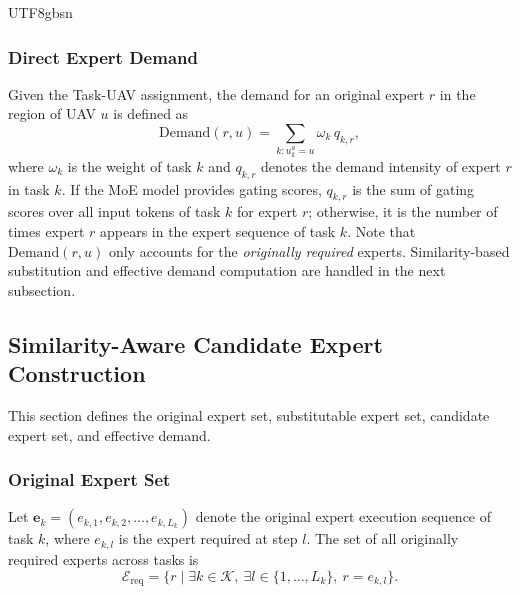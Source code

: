 \documentclass[journal]{IEEEtran}
\begin{document}
\begin{CJK*}{UTF8}{gbsn}
\subsubsection{Direct Expert Demand}
Given the Task-UAV assignment, the demand for an original expert \(r\) in the region of UAV \(u\) is defined as
\begin{equation}
\mathrm{Demand}(r,u) = \sum_{k : u_k^a = u} \omega_k \, q_{k,r},
\label{eq:demand}
\end{equation}
where \(\omega_k\) is the weight of task \(k\) and \(q_{k,r}\) denotes the demand intensity of expert \(r\) in task \(k\). If the MoE model provides gating scores, \(q_{k,r}\) is the sum of gating scores over all input tokens of task \(k\) for expert \(r\); otherwise, it is the number of times expert \(r\) appears in the expert sequence of task \(k\).
Note that \(\mathrm{Demand}(r,u)\) only accounts for the \emph{originally required} experts. Similarity-based substitution and effective demand computation are handled in the next subsection.

\subsection{Similarity-Aware Candidate Expert Construction}
\label{sec:similarity_candidate}
This section defines the original expert set, substitutable expert set, candidate expert set, and effective demand.
\subsubsection{Original Expert Set}
Let \(\mathbf{e}_k = (e_{k,1}, e_{k,2}, \dots, e_{k,L_k})\) denote the original expert execution sequence of task \(k\), where \(e_{k,l}\) is the expert required at step \(l\). The set of all originally required experts across tasks is
\begin{equation}
\mathcal{E}_{\mathrm{req}} = \{ r \mid \exists k \in \mathcal{K},\ \exists l \in \{1,\dots,L_k\},\ r = e_{k,l} \}.
\label{eq:ereq}
\end{equation}


\end{CJK*}
\end{document}
